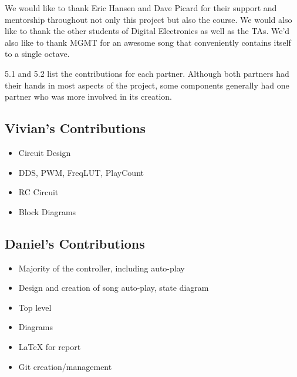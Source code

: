\documentclass{article}
\begin{document}
  

  We would like to thank Eric Hansen and Dave Picard for their support and mentorship throughout not only this project but also the course. We would also like to thank the other students of Digital Electronics as well as the TAs. We'd also like to thank MGMT for an awesome song that conveniently contains itself to a single octave.

  5.1 and 5.2 list the contributions for each partner. Although both partners had their hands in most aspects of the project, some components generally had one partner who was more involved in its creation.

  \subsection{Vivian's Contributions}
    \begin{itemize}
      \item Circuit Design
      \item DDS, PWM, FreqLUT, PlayCount
      \item RC Circuit
      \item Block Diagrams
    \end{itemize}

  \subsection{Daniel's Contributions}
    \begin{itemize}
      \item Majority of the controller, including auto-play
      \item Design and creation of song auto-play, state diagram
      \item Top level
      \item Diagrams
      \item LaTeX for report
      \item Git creation/management
    \end{itemize}
\end{document}
